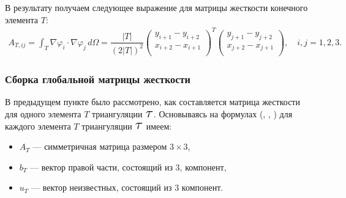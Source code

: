 \documentclass[12pt, a4paper]{article}
\renewcommand{\phi}{\varphi}
\newcommand\Tau{\scalerel*{\tau}{T}}
\begin{document}
				В результату получаем следующее выражение для матрицы жесткости конечного элемента $T$:
				\begin{eqnarray}
					A_{T,ij} = \int_{T} \nabla \phi_i \cdot \nabla \phi_j \, d\Omega
					= \dfrac{|T|}{(2|T|)^2} 
					\begin{pmatrix}
						y_{i+1} - y_{i+2}\\
						x_{i+2} - x_{i+1}\\
					\end{pmatrix}^T
					\begin{pmatrix}
						y_{j+1} - y_{j+2}\\
						x_{j+2} - x_{j+1}\\
					\end{pmatrix},
					\quad i,j=1,2,3.
					\label{A_stiff_in_T}
				\end{eqnarray}
				
			\subsubsection{Сборка глобальной матрицы жесткости}
				
				В предыдущем пункте было рассмотрено, как составляется матрица жесткости для одного элемента $T$ триангуляции $\Tau$. Основываясь на формулах (, , ) для каждого элемента $T$ триангуляции $\Tau$  имеем: 
				\begin{itemize}
					\item $A_T$ --- симметричная матрица размером $3 \times 3$,
					\item $b_T$ --- вектор правой части, состоящий из 3, компонент,
					\item $u_T$ --- вектор неизвестных, состоящий из 3 компонент.
				\end{itemize}
								
\end{document}
